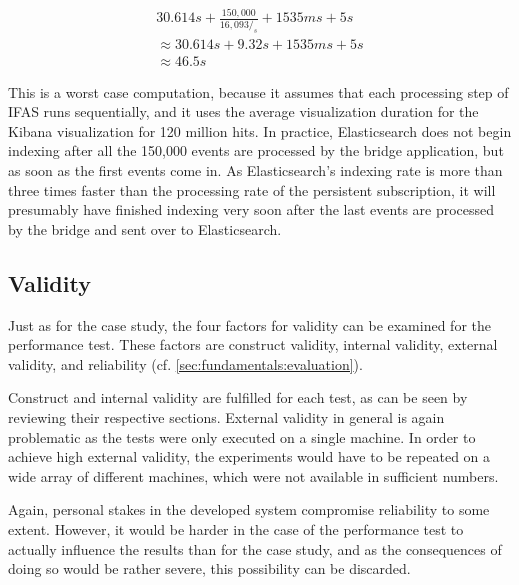 \begin{align*}
30.614s + \frac{150,000}{16,093/_s} + 1535ms + 5s \\
\approx 30.614s + 9.32s + 1535ms + 5s \\
\approx 46.5s 
\end{align*}

This is a worst case computation, because it assumes that each processing step of \ac{IFAS} runs sequentially, and it uses the average visualization duration for the Kibana visualization for 120 million hits.
In practice, Elasticsearch does not begin indexing after all the 150,000 events are processed by the bridge application, but as soon as the first events come in.
As Elasticsearch's indexing rate is more than three times faster than the processing rate of the persistent subscription, it will presumably have finished indexing very soon after the last events are processed by the bridge and sent over to Elasticsearch.

\subsection{Validity}
\label{subec:evaluation:user:validity}

Just as for the case study, the four factors for validity can be examined for the performance test.
These factors are construct validity, internal validity, external validity, and reliability (cf. \cref{sec:fundamentals:evaluation}).

Construct and internal validity are fulfilled for each test, as can be seen by reviewing their respective sections.
External validity in general is again problematic as the tests were only executed on a single machine.
In order to achieve high external validity, the experiments would have to be repeated on a wide array of different machines, which were not available in sufficient numbers.

Again, personal stakes in the developed system compromise reliability to some extent.
However, it would be harder in the case of the performance test to actually influence the results than for the case study, and as the consequences of doing so would be rather severe, this possibility can be discarded.

